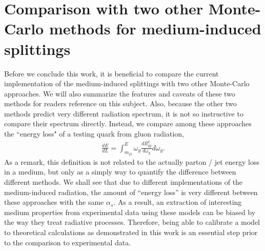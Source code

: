 \documentclass[aps, prc, reprint, amsmath, groupedaddress, nofootinbib]{revtex4-1}
\begin{document}
\section{Comparison with two other Monte-Carlo methods for medium-induced splittings}\label{section:compare}
Before we conclude this work, it is beneficial to compare the current implementation of the medium-induced splittings with two other Monte-Carlo approaches.
We will also summarize the features and caveats of these two methods for readers reference on this subject. 
Also, because the other two methods predict very different radiation spectrum, it is not so instructive to compare their spectrum directly.
Instead, we compare among these approaches the ``energy loss" of a testing quark from gluon radiation,
\begin{eqnarray}
\frac{dE}{dL} = \int_{m_D}^E \omega_g \frac{dR^q_{qg}}{d\omega_g} d\omega_g.
\label{eq:eloss}
\end{eqnarray}
As a remark, this definition is not related to the actually parton / jet energy loss in a medium, but only as a simply way to quantify the difference between different methods.
We shall see that due to different implementations of the medium-induced radiation, the amount of ``energy loss'' is very different between these approaches with the same $\alpha_s$.
As a result, an extraction of interesting medium properties from experimental data using these models can be biased by the way they treat radiative processes.
Therefore, being able to calibrate a model to theoretical calculations as demonstrated in this work is an essential step prior to the comparison to experimental data.
\end{document}
